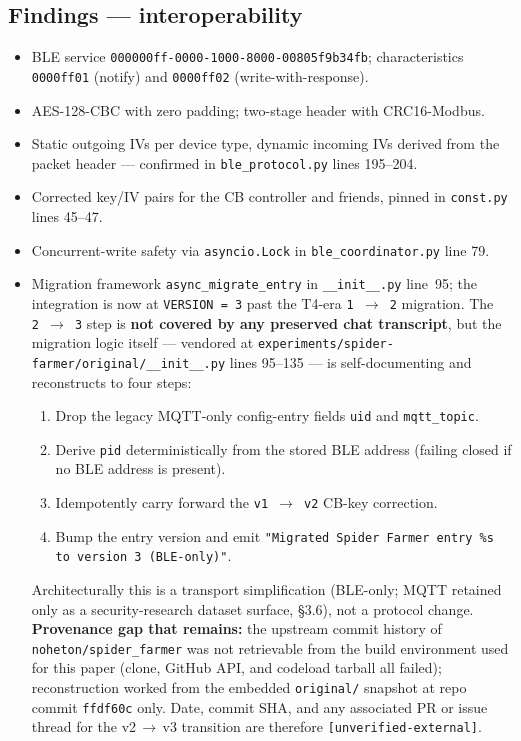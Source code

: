\documentclass[11pt,a4paper]{article}
\begin{document}
\subsection{Findings --- interoperability}
\label{sec:sf-interop}
\begin{itemize}
  \item BLE service \texttt{000000ff-0000-1000-8000-00805f9b34fb};
        characteristics \texttt{0000ff01} (notify) and \texttt{0000ff02}
        (write-with-response).
  \item AES-128-CBC with zero padding; two-stage header with CRC16-Modbus.
  \item Static outgoing IVs per device type, dynamic incoming IVs derived
        from the packet header --- confirmed in
        \texttt{ble\_protocol.py} lines 195--204.
  \item Corrected key/IV pairs for the CB controller and friends, pinned in
        \texttt{const.py} lines 45--47.
  \item Concurrent-write safety via \texttt{asyncio.Lock} in
        \texttt{ble\_coordinator.py} line 79.
  \item Migration framework \texttt{async\_migrate\_entry} in
        \texttt{\_\_init\_\_.py} line~95; the integration is now at
        \texttt{VERSION = 3} past the T4-era \texttt{1\,$\to$\,2}
        migration. The \texttt{2\,$\to$\,3} step is \textbf{not covered
        by any preserved chat transcript}, but the migration logic
        itself --- vendored at
        \texttt{experiments/spider-farmer/original/\_\_init\_\_.py}
        lines 95--135 --- is self-documenting and reconstructs to four
        steps:
        \begin{enumerate}
          \item Drop the legacy MQTT-only config-entry fields
                \texttt{uid} and \texttt{mqtt\_topic}.
          \item Derive \texttt{pid} deterministically from the stored
                BLE address (failing closed if no BLE address is
                present).
          \item Idempotently carry forward the
                \texttt{v1\,$\to$\,v2} CB-key correction.
          \item Bump the entry version and emit
                \texttt{"Migrated Spider Farmer entry \%s to version 3
                (BLE-only)"}.
        \end{enumerate}
        Architecturally this is a transport simplification (BLE-only;
        MQTT retained only as a security-research dataset surface,
        \S3.6), not a protocol change. \textbf{Provenance gap that
        remains:} the upstream commit history of
        \texttt{noheton/spider\_farmer} was not retrievable from the
        build environment used for this paper (clone, GitHub API, and
        codeload tarball all failed); reconstruction worked from the
        embedded \texttt{original/} snapshot at repo commit
        \texttt{ffdf60c} only. Date, commit SHA, and any associated PR
        or issue thread for the v2\,$\to$\,v3 transition are therefore
        \texttt{[unverified-external]}.
\end{itemize}
\end{document}
